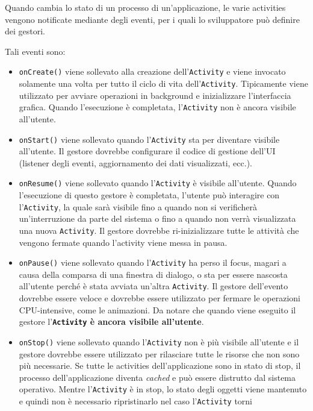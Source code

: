 Quando cambia lo stato di un processo di un'applicazione, le varie
activities vengono notificate mediante degli eventi, per i quali lo
sviluppatore può definire dei gestori.

Tali eventi sono:

\begin{itemize}
	\item \texttt{onCreate()} viene sollevato alla creazione dell'\texttt{Activity} e
		viene invocato solamente una volta per tutto il ciclo di vita
		dell'\texttt{Activity}. Tipicamente viene utilizzato per avviare operazioni in
		background e inizializzare l'interfaccia grafica. Quando
		l'esecuzione è completata, l'\texttt{Activity} non è ancora visibile
		all'utente.
	\item \texttt{onStart()} viene sollevato quando l'\texttt{Activity} sta per diventare
		visibile all'utente. Il gestore dovrebbe configurare il codice di
		gestione dell'UI (listener degli eventi, aggiornamento dei dati
		visualizzati, ecc.).
	\item \texttt{onResume()} viene sollevato quando l'\texttt{Activity} è visibile
		all'utente. Quando l'esecuzione di questo gestore è completata,
		l'utente può interagire con l'\texttt{Activity}, la quale sarà visibile fino a
		quando non si verificherà un'interruzione da parte del sistema o fino
		a quando non verrà visualizzata una nuova \texttt{Activity}. Il gestore
		dovrebbe ri-inizializzare tutte le attività che vengono fermate quando
		l'activity viene messa in pausa.
	\item \texttt{onPause()} viene sollevato quando l'\texttt{Activity} ha perso il
		focus, magari a causa della comparsa di una finestra di dialogo, o sta
		per essere nascosta all'utente perché è stata avviata un'altra
		\texttt{Activity}. Il gestore dell'evento dovrebbe essere veloce e dovrebbe
		essere utilizzato per fermare le operazioni CPU-intensive, come le
		animazioni. Da notare che quando viene eseguito il gestore
		l'\textbf{\texttt{Activity} è ancora visibile all'utente}.
	\item \texttt{onStop()} viene sollevato quando l'\texttt{Activity} non è più visibile
		all'utente e il gestore dovrebbe essere utilizzato per rilasciare
		tutte le risorse che non sono più necessarie. Se tutte le activities
		dell'applicazione sono in stato di stop, il processo dell'applicazione
		diventa \emph{cached} e può essere distrutto dal sistema operativo.
		Mentre l'\texttt{Activity} è in stop, lo stato degli oggetti viene mantenuto e
		quindi non è necessario ripristinarlo nel caso l'\texttt{Activity} torni

\end{itemize}
